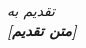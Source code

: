 \chapter*{}
\thispagestyle{empty}
\vspace*{\fill}
\begin{center}
{\Large\itshape
تقدیم به\\[1cm]
\textbf{[متن تقدیم]}
}
\end{center}
\vspace*{\fill}
\cleardoublepage

